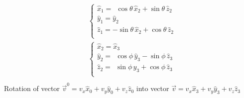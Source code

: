 \documentclass[letterpaper,10pt,english]{jupyterBook}
\begin{document}
\begin{equation*}
\begin{split}
\begin{aligned}
& \begin{cases}
 \hat{x}_1 = \ \ \cos \theta \, \hat{x}_2 + \sin \theta \, \hat{z}_2  \\
 \hat{y}_1 =                    \hat{y}_2                             \\
 \hat{z}_1 =   - \sin \theta \, \hat{x}_2 + \cos \theta \, \hat{z}_2  \\
\end{cases} \\
& \begin{cases}
 \hat{x}_2 =                  \hat{x}_3                          \\ 
 \hat{y}_2 = \ \ \cos \phi \, \hat{y}_3 - \sin \phi \, \hat{z}_3 \\
 \hat{z}_2 = \ \ \sin \phi \, \hat{y}_3 + \cos \phi \, \hat{z}_3 \\ 
\end{cases} \\
\end{aligned}
\end{split}
\end{equation*}
\sphinxAtStartPar
Rotation of vector \(\vec{v}^0 = v_x \hat{x}_0 + v_y \hat{y}_0 + v_z \hat{z}_0\) into vector \(\vec{v} = v_x \hat{x}_3 + v_y \hat{y}_3 + v_z \hat{z}_3\)
\end{document}
